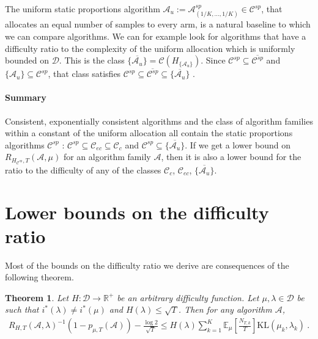 \documentclass{article}
\newcommand{\KL}{\mathrm{KL}}
\newtheorem{theorem}{Theorem}
\begin{document}
The uniform static proportions algorithm $\mathcal A_u := \mathcal A_{(1/K, \ldots, 1/K)}^{sp} \in \mathcal C^{sp}$, that allocates an equal number of samples to every arm, is a natural baseline to which we can compare algorithms.
We can for example look for algorithms that have a difficulty ratio to the complexity of the uniform allocation which is uniformly bounded on $\mathcal D$. This is the class $\overline{\{\mathcal A_u\}} = \mathcal C(H_{\{\mathcal A_u\}})$.
Since $\mathcal C^{sp} \subseteq \overline{\mathcal C^{sp}}$ and $\{\mathcal A_u\} \subseteq \mathcal C^{sp}$, that class satisfies $\mathcal C^{sp} \subseteq \overline{\mathcal C^{sp}} \subseteq \overline{\{\mathcal A_u\}}$ .


\paragraph{Summary}
\label{par:summary}

Consistent, exponentially consistent algorithms and the class of algorithm families within a constant of the uniform allocation all contain the static proportions algorithms $\mathcal C^{sp}$ : $\mathcal C^{sp} \subseteq \mathcal C_{ec} \subseteq \mathcal C_c$ and $\mathcal C^{sp} \subseteq \overline{\{\mathcal A_u\}}$.
If we get a lower bound on $R_{H_{\mathcal C^{sp}}, T}(\mathcal A, \mu)$ for an algorithm family $\mathcal A$, then it is also a lower bound for the ratio to the difficulty of any of the classes $\mathcal C_{c}$, $\mathcal C_{ec}$, $\overline{\{\mathcal A_u\}}$.

\section{Lower bounds on the difficulty ratio}
\label{sec:main_tool}

Most of the bounds on the difficulty ratio we derive are consequences of the following theorem.
\begin{theorem}\label{thm:R_LB}
Let $H : \mathcal D \to \mathbb{R}^+$ be an arbitrary difficulty function.
Let $\mu, \lambda \in \mathcal D$ be such that $i^*(\lambda) \ne i^*(\mu)$ and $H(\lambda) \le \sqrt{T}$. Then for any algorithm $\mathcal A$,
\begin{align*}
R_{H,T}(\mathcal A, \lambda)^{-1} (1 - p_{\mu,T}(\mathcal A)) - \frac{\log 2}{\sqrt{T}}
\le H(\lambda)\sum_{k=1}^K \mathbb{E}_\mu[\frac{N_{T,k}}{T}] \KL(\mu_k, \lambda_k)
\: .
\end{align*}
\end{theorem}
\end{document}
